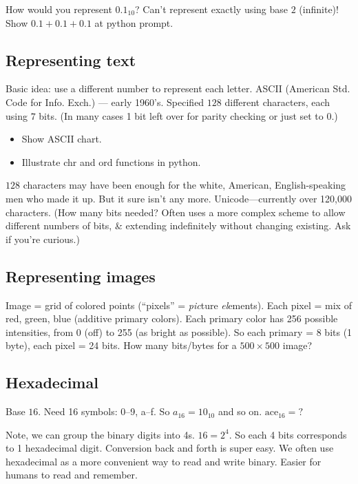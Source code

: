\documentclass{article}
\begin{document}
How would you represent $0.1_{10}$?  Can't represent exactly using
base $2$ (infinite)! Show $0.1 + 0.1 + 0.1$ at python prompt.

\subsection*{Representing text}

Basic idea: use a different number to represent each letter.  ASCII
(American Std. Code for Info. Exch.) --- early 1960's.  Specified
$128$ different characters, each using $7$ bits.  (In many cases 1 bit
left over for parity checking or just set to $0$.)
\begin{itemize}
\item Show ASCII chart.
\item Illustrate chr and ord functions in python.
\end{itemize}
$128$ characters may have been enough for the white, American,
English-speaking men who made it up.  But it sure isn't any more.
Unicode---currently over 120,000 characters. (How many bits needed?
Often uses a more complex scheme to allow different numbers of bits,
\& extending indefinitely without changing existing.  Ask if you're
curious.)

\subsection*{Representing images}

Image = grid of colored points (``pixels'' = \emph{pic}ture
\emph{el}ements).  Each pixel = mix of red, green, blue (additive
primary colors).  Each primary color has 256 possible intensities,
from 0 (off) to 255 (as bright as possible).  So each primary = 8 bits
(1 byte), each pixel = 24 bits.  How many bits/bytes for a $500 \times
500$ image?

\subsection*{Hexadecimal}

Base $16$.  Need 16 symbols: 0--9, a--f. So $a_{16} = 10_{10}$ and so
on. $\mbox{ace}_{16} = ?$

Note, we can group the binary digits into 4s.  $16 = 2^4$.  So each 4
bits corresponds to 1 hexadecimal digit.  Conversion back and forth is
super easy.  We often use hexadecimal as a more convenient way to read
and write binary.  Easier for humans to read and remember.
\end{document}
